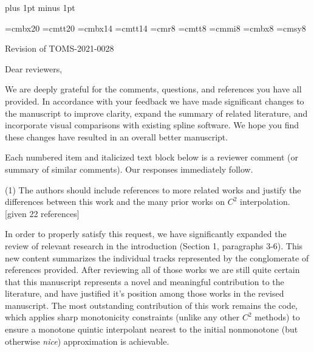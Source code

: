 
\parindent=0pt
\parskip=9pt
\baselineskip=13pt plus 1pt minus 1pt \lineskiplimit=1pt


\def\BEGINC{\textRed}
\def\ENDC{\textBlack}
\def\red#1{\BEGINC#1\ENDC}
\let\beginred=\BEGINC
\let\endred=\ENDC

\font\titlebf=cmbx20
\font\titlett=cmtt20
\font\headingbf=cmbx14
\font\headingtt=cmtt14
\font\caprm=cmr8
\font\captt=cmtt8
\font\capit=cmmi8
\font\capbf=cmbx8
\font\capsy=cmsy8
\def\captext{
  \narrower
  \noindent
  \caprm
  \baselineskip=10pt plus 2pt minus 1pt
  \lineskiplimit=2pt
  \lineskip=2pt plus 1pt
  \parskip=0pt
  \textfont0=\caprm
  \textfont1=\capit
  \textfont2=\capsy
}




{\titlebf Revision of {\titlett TOMS-2021-0028} \bigskip}

Dear reviewers,

We are deeply grateful for the comments, questions, and references you
have all provided. In accordance with your feedback we have made
significant changes to the manuscript to improve clarity, expand the
summary of related literature, and incorporate visual comparisons with
existing spline software. We hope you find these changes have resulted
in an overall better manuscript.

Each numbered item and italicized text block below is a reviewer
comment (or summary of similar comments). Our responses immediately
follow.


\goodbreak
{\parindent=20pt \it

\item{(1)} The authors should include references to more related works
  and justify the differences between this work and the many prior
  works on $C^2$ interpolation. [given 22 references]

}

In order to properly satisfy this request, we have significantly
expanded the review of relevant research in the introduction (Section
1, paragraphs 3-6). This new content summarizes the individual tracks
represented by the conglomerate of references provided. After
reviewing all of those works we are still quite certain that this
manuscript represents a novel and meaningful contribution to the
literature, and have justified it's position among those works in the
revised manuscript. The most outstanding contribution of this work
remains the code, which applies sharp monotonicity constraints (unlike
any other $C^2$ methods) to ensure a monotone quintic interpolant
nearest to the initial nonmonotone (but otherwise {\it nice})
approximation is achievable.


